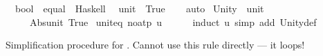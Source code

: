 \begin{isabellebody}
{\isacharbar}{\kern0pt}\ \ {\isachardoublequoteopen}bool{\isachardoublequoteclose}\ {\isacharcolon}{\kern0pt}{\isacharcolon}{\kern0pt}\ {\isachardoublequoteopen}equal{\isachardoublequoteclose}\ {\isasymrightharpoonup}\ {\isacharparenleft}{\kern0pt}Haskell{\isacharparenright}{\kern0pt}\ {\isacharminus}{\kern0pt}%
\isadelimdocument
%
\endisadelimdocument
%
\isatagdocument
%
\isamarkuptrue%
%
\endisatagdocument
{\isafolddocument}%
%
\isadelimdocument
%
\endisadelimdocument
{}\isamarkupfalse%
\ unit\ {\isacharequal}{\kern0pt}\ {\isachardoublequoteopen}{\isacharbraceleft}{\kern0pt}True{\isacharbraceright}{\kern0pt}{\isachardoublequoteclose}\isanewline
%
\isadelimproof
\ \ %
\endisadelimproof
%
\isatagproof
{}\isamarkupfalse%
\ auto%
\endisatagproof
{\isafoldproof}%
%
\isadelimproof
\isanewline
%
\endisadelimproof
\isanewline
{}\isamarkupfalse%
\ Unity\ {\isacharcolon}{\kern0pt}{\isacharcolon}{\kern0pt}\ unit\ \ {\isacharparenleft}{\kern0pt}{\isachardoublequoteopen}{\isacharprime}{\kern0pt}{\isacharparenleft}{\kern0pt}{\isacharprime}{\kern0pt}{\isacharparenright}{\kern0pt}{\isachardoublequoteclose}{\isacharparenright}{\kern0pt}\isanewline
\ \ \ {\isachardoublequoteopen}{\isacharparenleft}{\kern0pt}{\isacharparenright}{\kern0pt}\ {\isacharequal}{\kern0pt}\ Abs{\isacharunderscore}{\kern0pt}unit\ True{\isachardoublequoteclose}\isanewline
\isanewline
{}\isamarkupfalse%
\ unit{\isacharunderscore}{\kern0pt}eq\ {\isacharbrackleft}{\kern0pt}no{\isacharunderscore}{\kern0pt}atp{\isacharbrackright}{\kern0pt}{\isacharcolon}{\kern0pt}\ {\isachardoublequoteopen}u\ {\isacharequal}{\kern0pt}\ {\isacharparenleft}{\kern0pt}{\isacharparenright}{\kern0pt}{\isachardoublequoteclose}\isanewline
%
\isadelimproof
\ \ %
\endisadelimproof
%
\isatagproof
{}\isamarkupfalse%
\ {\isacharparenleft}{\kern0pt}induct\ u{\isacharparenright}{\kern0pt}\ {\isacharparenleft}{\kern0pt}simp\ add{\isacharcolon}{\kern0pt}\ Unity{\isacharunderscore}{\kern0pt}def{\isacharparenright}{\kern0pt}%
\endisatagproof
{\isafoldproof}%
%
\isadelimproof
%
\endisadelimproof
%
\begin{isamarkuptext}%
Simplification procedure for .  Cannot use
  this rule directly --- it loops!%
\end{isamarkuptext}\isamarkuptrue%
%
\isadelimML
%
\endisadelimML
%
\isatagML
{}\isamarkupfalse%

\end{isabellebody}
